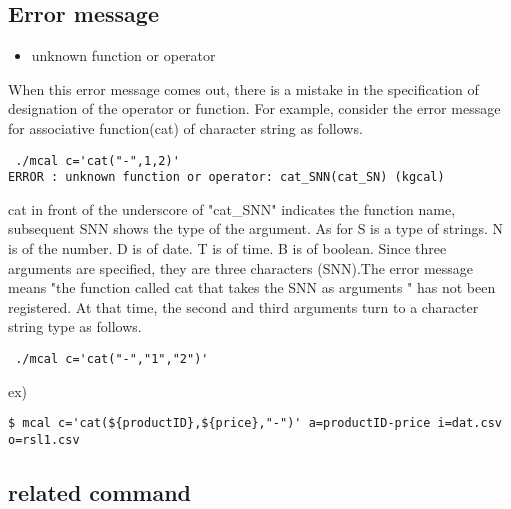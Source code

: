 \documentclass[fleqn,a4paper]{jarticle}
\begin{document}
\subsection*{Error message}
\noindent
  \begin{itemize}
   \item unknown function or operator\\
    
  \end{itemize}
When this error message comes out, there is a mistake in the specification of designation of the operator or function.
For example, consider the error message for associative function(cat) of character string as follows.
\begin{verbatim}   
 ./mcal c='cat("-",1,2)'
ERROR : unknown function or operator: cat_SNN(cat_SN) (kgcal)
\end{verbatim}
\noindent
cat in front of the underscore of "cat\_SNN" indicates the function name, subsequent SNN shows the type of the argument.
As for S is a type of strings. N is of the number. D is of date. T is of time. B is of boolean. Since three arguments are specified, they are three characters (SNN).The error message means "the function called cat that takes the SNN as arguments " has not been registered. At that time, the second and third arguments turn to a character string type as follows. \begin{verbatim}   
 ./mcal c='cat("-","1","2")'
 \end{verbatim}   
\noindent
ex)
\begin{verbatim}   
$ mcal c='cat(${productID},${price},"-")' a=productID-price i=dat.csv o=rsl1.csv
\end{verbatim}


\subsection*{related command}
\end{document}
